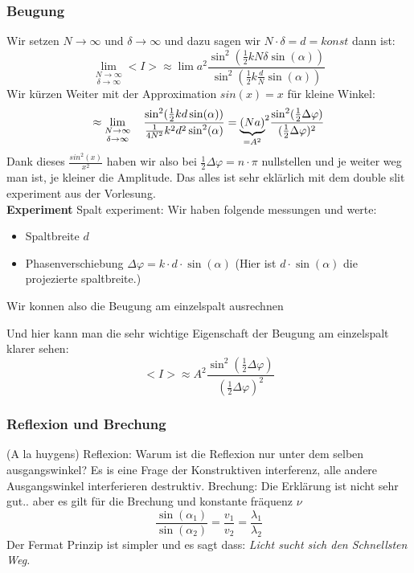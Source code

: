 \documentclass{article}
\newcommand{\mspc}{\hspace{0.4cm}}
\newcommand{\experiment}{\\[2ex]\textbf{Experiment }}
\begin{document}
\subsubsection{Beugung} Wir setzen $N\rightarrow \infty$ und $\delta \rightarrow \infty$ und dazu sagen wir $N\cdot \delta =d=konst$ dann ist:\[\underset{\delta\rightarrow\infty}{\lim_{N\rightarrow\infty}}<I>\approx \lim a^2 \frac{\sin^2(\frac{1}{2}kN\delta\sin(\alpha))}{\sin^2(\frac{1}{2}k\frac{d}{N}\sin(\alpha))}\]
Wir kürzen Weiter mit der Approximation $sin(x)=x$ für kleine Winkel: \[\approx\underset{\delta\rightarrow\infty}{\lim_{N\rightarrow\infty}}\mspc\frac{\sin^2(\frac{1}{2}kd\sin(\alpha))}{\frac{1}{4N^2}k^2d^2\sin^2(\alpha)}=\underset{=A^2}{\underbrace{(Na)}}^2\frac{\sin^2(\frac{1}{2}\Delta\varphi)}{(\frac{1}{2}\Delta\varphi)^2}\]
Dank dieses $\frac{sin^2(x)}{x^2}$ haben wir also bei $\frac{1}{2}\Delta\varphi=n\cdot\pi$ nullstellen und je weiter weg man ist, je kleiner die Amplitude. Das alles ist sehr eklärlich mit dem double slit experiment aus der Vorlesung.
\experiment Spalt experiment: Wir haben folgende messungen und werte:\begin{itemize}
  \item{Spaltbreite $d$}
  \item{Phasenverschiebung $\Delta\varphi=k\cdot d\cdot\sin(\alpha)$ (Hier ist $d\cdot\sin(\alpha)$ die projezierte spaltbreite.)}
\end{itemize}
Wir konnen also die Beugung am einzelspalt ausrechnen 
\begin{multicols}{2}
\vfill\null
\columnbreak
Und hier kann man die sehr wichtige Eigenschaft der Beugung am einzelspalt klarer sehen:\[<I>\approx A^2\frac{\sin^2(\frac{1}{2}\Delta\varphi)}{(\frac{1}{2}\Delta\varphi)^2}\]
\end{multicols}
\subsubsection{Reflexion und Brechung } (A la huygens)
\newline Reflexion: Warum ist die Reflexion nur unter dem selben ausgangswinkel? Es is eine Frage der Konstruktiven interferenz, alle andere Ausgangswinkel interferieren destruktiv.\newline
Brechung: Die Erklärung ist nicht sehr gut.. aber es gilt für die Brechung und konstante fräquenz $\nu$ \[\frac{\sin(\alpha_1)}{\sin(\alpha_2)}=\frac{v_1}{v_2}=\frac{\lambda_1}{\lambda_2}\] 
Der Fermat Prinzip ist simpler und es sagt dass: \textit{Licht sucht sich den Schnellsten Weg.}
\end{document}
